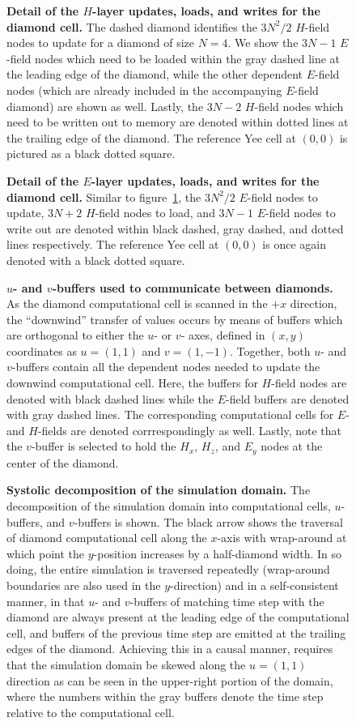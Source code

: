 \documentclass[12pt]{article}
\newcommand{\myfig}[3]{
  \begin{figure}[bp]
		\begin{center}
			
      \caption{\textbf{#2}#3\label{fig:#1}}
		\end{center}
	\end{figure}
}
\begin{document}
\myfig{3d-h-layer}{
  Detail of the $H$-layer updates, loads, and writes for the diamond cell.}{
	The dashed diamond identifies the $3N^2 / 2$ $H$-field nodes
    to update for a diamond of size $N=4$.
  We show the $3N - 1$ $E$-field nodes which need to be loaded
    within the gray dashed line at the leading edge of the diamond,
    while the other dependent $E$-field nodes
    (which are already included in the accompanying $E$-field diamond)
    are shown as well.
  Lastly, the $3N - 2$ $H$-field nodes which need to be written out to memory
    are denoted within dotted lines
    at the trailing edge of the diamond.
  The reference Yee cell at $(0, 0)$ is pictured as a black dotted square.
}

\myfig{3d-e-layer}{
  Detail of the $E$-layer updates, loads, and writes for the diamond cell.}{
	Similar to figure~\ref{fig:3d-h-layer},
  	the $3N^2 / 2$ $E$-field nodes to update,
    $3N + 2$ $H$-field nodes to load,
    and $3N - 1$ $E$-field nodes to write out
    are denoted within
    black dashed, gray dashed, and dotted lines respectively.
  The reference Yee cell at $(0, 0)$
    is once again denoted with a black dotted square.
}

\myfig{3d-connect}{
  $u$- and $v$-buffers used to communicate between diamonds.}{
  As the diamond computational cell is scanned in the $+x$ direction,
    the ``downwind'' transfer of values occurs by means of buffers
    which are orthogonal to either the $u$- or $v$- axes,
    defined in $(x, y)$ coordinates as $u = (1, 1)$ and $v = (1, -1)$.
  Together, both $u$- and $v$-buffers contain all the dependent nodes 
    needed to update the downwind computational cell.
  Here, the buffers for $H$-field nodes are denoted with black dashed lines
    while the $E$-field buffers are denoted with gray dashed lines.
  The corresponding computational cells for $E$- and $H$-fields
    are denoted corrrespondingly as well.
  Lastly, note that the $v$-buffer is selected
    to hold the $H_x$, $H_z$, and $E_y$ nodes at the center of the diamond.
}

\myfig{3d-decomposition}{
  Systolic decomposition of the simulation domain.}{
  The decomposition of the simulation domain into
    computational cells, $u$-buffers, and $v$-buffers is shown.
  The black arrow shows the traversal of diamond computational cell
    along the $x$-axis with wrap-around
    at which point the $y$-position increases by a half-diamond width.
  In so doing,
    the entire simulation is traversed repeatedly
    (wrap-around boundaries are also used in the $y$-direction)
    and in a self-consistent manner,
    in that $u$- and $v$-buffers of matching time step with the diamond
    are always present at the leading edge of the computational cell,
    and buffers of the previous time step are emitted
    at the trailing edges of the diamond.
  Achieving this in a causal manner,
    requires that the simulation domain be skewed
    along the $u = (1, 1)$ direction
    as can be seen in the upper-right portion of the domain,
    where the numbers within the gray buffers
    denote the time step relative to the computational cell.
}
\end{document}
